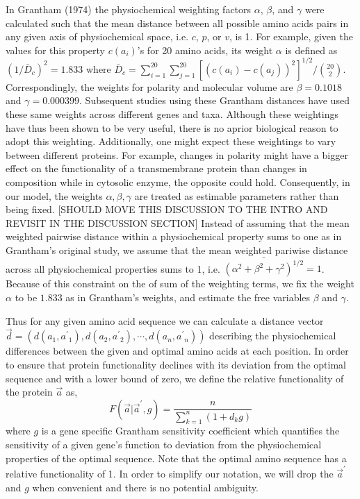 \documentclass[13pt]{article}
\newcommand{\avecopt}{\ensuremath{\vec{a}^\prime}\xspace}
\newcommand{\aopt}{\ensuremath{a^\prime}\xspace}
\begin{document}
In Grantham (1974) the physiochemical weighting factors $\alpha$, $\beta$, and $\gamma$ were calculated such that the mean distance between all possible amino acids pairs in any given axis of physiochemical space, i.e. $c$, $p$, or $v$, is 1.
For example, given the values for this property $c\left(a_i\right)$'s for 20 amino acids, its weight $\alpha$ is defined as $(1/\bar{D}_c)^2 = 1.833$ where $\bar{D}_c = \sum_{i=1}^{20}  \sum_{j=1}^{20}[(c\left(a_i\right) - c\left(a_j\right))^2]^{1/2}/\binom{20}{2}$.
Correspondingly, the weights for polarity and molecular volume are $\beta = 0.1018$ and $\gamma = 0.000399$.
Subsequent studies using these Grantham distances have used these same weights across different genes and taxa.
Although these weightings have thus been shown to be very useful,  there is no aprior biological reason to adopt this weighting.
Additionally, one might expect these weightings to vary between different proteins.
For example, changes in polarity might have a bigger effect on the functionality of a transmembrane protein than changes in composition while in cytosolic enzyme, the opposite could hold.
Consequently, in our model, the weights $\alpha, \beta, \gamma$ are treated as estimable parameters rather than being fixed.
[SHOULD MOVE THIS DISCUSSION TO THE INTRO AND REVISIT IN THE DISCUSSION SECTION] 
Instead of assuming that the mean weighted pairwise distance within a physiochemical property sums to one as in Grantham's original study, we assume that the mean weighted pariwise distance across all physiochemical properties sums to 1, i.e. $\bar{\left(\alpha^2 + \beta^2 + \gamma^2\right)^{1/2}} = 1$.
Because of this constraint on the of sum of the weighting terms, we fix the weight $\alpha$ to be $1.833$ as in Grantham's weights, and estimate the free variables $\beta$ and $\gamma$.



Thus for any given amino acid sequence we can calculate a distance vector $\vec{d} = (d\left(a_1, \aopt_1\right), d\left(a_2, \aopt_2\right), \cdots, d\left(a_n, \aopt_n\right))$ describing the physiochemical differences between the given and optimal amino acids at each position.
In order to ensure that protein functionality declines with its deviation from the optimal sequence and with a lower bound of zero, we define the relative functionality of the protein $\vec{a}$ as,
\begin{equation}
F(\vec{a}| \avecopt,g)  =  \frac{n}{\sum_{k=1}^n{(1+d_kg)}} \label{eq:harmonic}
\end{equation}
where $g$ is a gene specific Grantham sensitivity coefficient which quantifies the sensitivity of a given gene's function to deviation from the physiochemical properties of the optimal sequence.
Note that the optimal amino sequence has a relative functionality of 1.
In order to simplify our notation, we will drop the $\avecopt$ and $g$ when convenient and there is no potential ambiguity.
\end{document}

